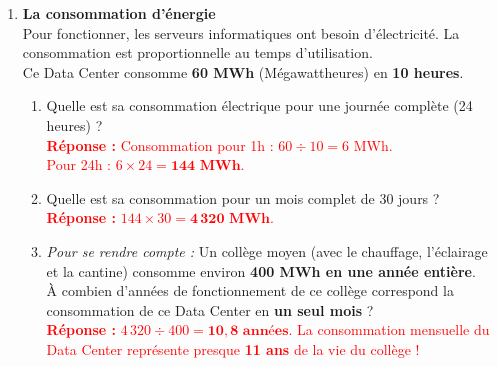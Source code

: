 \documentclass[a4paper]{book}
\begin{document}
{\begin{exercice}
\begin{enumerate}
\begin{enumerate}
            \item \textit{Pour se rendre compte :} Un film en très haute définition pèse environ 5 Go. Combien de films ce Data Center traite-il en une seule heure ? \\
            \textcolor{red}{\textbf{Réponse :} $75 \div 5 = \mathbf{15 \text{ films}}$. Cela correspond à 15 films par heure.}
            
            \item Combien de temps lui faut-il pour traiter \textbf{1 To} (Téraoctet), sachant que $1 \text{ To} = 1\,000 \text{ Go}$ ? \\
            \textcolor{red}{\textbf{Réponse :} $1\,000 \div 75 \approx \mathbf{13,33 \text{ heures}}$ (soit environ 13h et 20 minutes).}
        \end{enumerate}
        
        \item \textbf{La consommation d'énergie} \\
        Pour fonctionner, les serveurs informatiques ont besoin d'électricité. La consommation est proportionnelle au temps d'utilisation. \\
        Ce Data Center consomme \textbf{60 MWh} (Mégawattheures) en \textbf{10 heures}.
        \begin{enumerate}
            \item Quelle est sa consommation électrique pour une journée complète (24 heures) ? \\
            \textcolor{red}{\textbf{Réponse :} Consommation pour 1h : $60 \div 10 = 6$ MWh. \\ Pour 24h : $6 \times 24 = \mathbf{144 \text{ MWh}}$.}
            
            \item Quelle est sa consommation pour un mois complet de 30 jours ? \\
            \textcolor{red}{\textbf{Réponse :} $144 \times 30 = \mathbf{4\,320 \text{ MWh}}$.}
            
            \item \textit{Pour se rendre compte :} Un collège moyen (avec le chauffage, l'éclairage et la cantine) consomme environ \textbf{400 MWh en une année entière}. \\
            À combien d'années de fonctionnement de ce collège correspond la consommation de ce Data Center en \textbf{un seul mois} ? \\
            \textcolor{red}{\textbf{Réponse :} $4\,320 \div 400 = \mathbf{10,8 \text{ années}}$. La consommation mensuelle du Data Center représente presque \textbf{11 ans} de la vie du collège !}
        \end{enumerate}
    \end{enumerate}
    \end{exercice}


}
\end{document}
